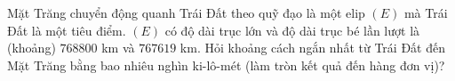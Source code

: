 \begin{ex}
Mặt Trăng chuyển động quanh Trái Đất theo quỹ đạo là một elip $(E)$ mà Trái Đất là một tiêu điểm. $(E)$ có độ dài trục lớn và độ dài trục bé lần lượt là (khoảng) $768800$ km và $767619$ km. Hỏi khoảng cách ngắn nhất từ Trái Đất đến Mặt Trăng bằng bao nhiêu nghìn ki-lô-mét (làm tròn kết quả đến hàng đơn vị)?
\end{ex}
